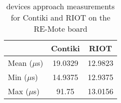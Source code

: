 \begin{table}[!ht]
  \centering
  \begin{tabular}{l|c|c}
                & Contiki  & RIOT \\ \hline
  Mean ($\mu$s) & 19.0329  & 12.9823 \\
  Min  ($\mu$s) & 14.9375  & 12.9375 \\
  Max  ($\mu$s) & 91.75    & 13.0156
  \end{tabular}
  \caption{devices approach measurements for Contiki and RIOT on the RE-Mote board}
  \label{tab:devices-framework-remote}
  \end{table}